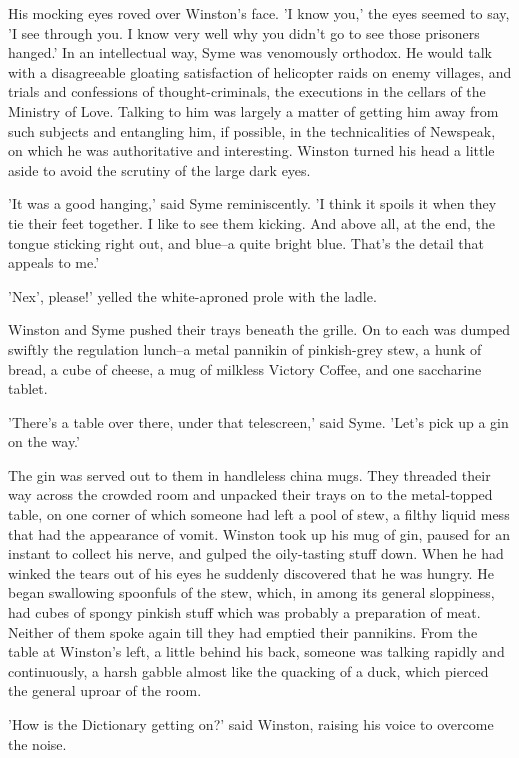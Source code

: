\documentclass{article}
\begin{document}
His mocking eyes roved over Winston's face. 'I know you,' the eyes seemed
to say, 'I see through you. I know very well why you didn't go to see
those prisoners hanged.' In an intellectual way, Syme was venomously
orthodox. He would talk with a disagreeable gloating satisfaction of
helicopter raids on enemy villages, and trials and confessions of
thought-criminals, the executions in the cellars of the Ministry of Love.
Talking to him was largely a matter of getting him away from such subjects
and entangling him, if possible, in the technicalities of Newspeak, on
which he was authoritative and interesting. Winston turned his head a
little aside to avoid the scrutiny of the large dark eyes.

'It was a good hanging,' said Syme reminiscently. 'I think it spoils it
when they tie their feet together. I like to see them kicking. And above
all, at the end, the tongue sticking right out, and blue--a quite bright
blue. That's the detail that appeals to me.'

'Nex', please!' yelled the white-aproned prole with the ladle.

Winston and Syme pushed their trays beneath the grille. On to each was
dumped swiftly the regulation lunch--a metal pannikin of pinkish-grey stew,
a hunk of bread, a cube of cheese, a mug of milkless Victory Coffee, and
one saccharine tablet.

'There's a table over there, under that telescreen,' said Syme. 'Let's pick
up a gin on the way.'

The gin was served out to them in handleless china mugs. They threaded
their way across the crowded room and unpacked their trays on to the
metal-topped table, on one corner of which someone had left a pool of stew,
a filthy liquid mess that had the appearance of vomit. Winston took up his
mug of gin, paused for an instant to collect his nerve, and gulped the
oily-tasting stuff down. When he had winked the tears out of his eyes he
suddenly discovered that he was hungry. He began swallowing spoonfuls of
the stew, which, in among its general sloppiness, had cubes of spongy
pinkish stuff which was probably a preparation of meat. Neither of them
spoke again till they had emptied their pannikins. From the table at
Winston's left, a little behind his back, someone was talking rapidly and
continuously, a harsh gabble almost like the quacking of a duck, which
pierced the general uproar of the room.

'How is the Dictionary getting on?' said Winston, raising his voice to
overcome the noise.
\end{document}
